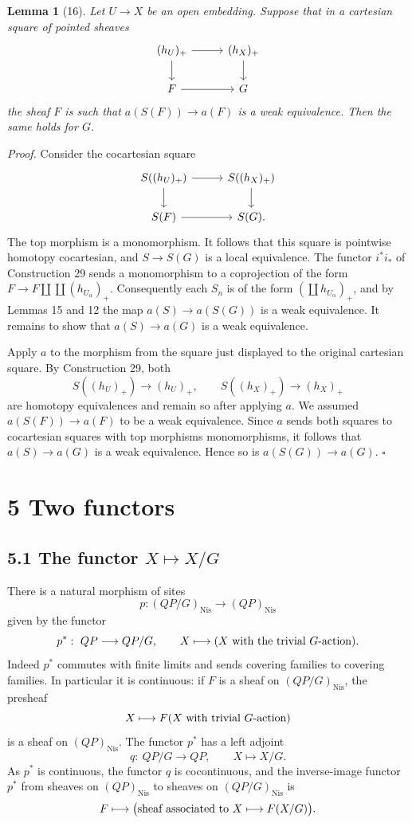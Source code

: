 \documentclass[11pt]{article}
\newcommand{\Nis}{\mathrm{Nis}}
\theoremstyle{deligne}
\newtheorem*{lemma*}{Lemma}
\newenvironment{proofdel}{\noindent\textit{Proof.}}{\hfill$\square$}
\begin{document}
\begin{lemma*}[16]
Let \(U\to X\) be an open embedding. Suppose that in a cartesian square of pointed sheaves
\[
\begin{tikzcd}[column sep=2.8em,row sep=1.8em]
(h_U)_+ \arrow[r] \arrow[d] & (h_X)_+ \arrow[d]\\
F \arrow[r] & G
\end{tikzcd}
\]
the sheaf \(F\) is such that \(a(S(F))\to a(F)\) is a weak equivalence. Then the same holds for \(G\).
\end{lemma*}

\begin{proofdel}
Consider the cocartesian square
\[
\begin{tikzcd}[column sep=2.8em,row sep=1.8em]
S((h_U)_+) \arrow[r] \arrow[d] & S((h_X)_+) \arrow[d]\\
S(F) \arrow[r] & S(G).
\end{tikzcd}
\]
The top morphism is a monomorphism. It follows that this square is pointwise homotopy cocartesian, and \(S\to S(G)\) is a local equivalence. The functor \(i^*i_*\) of Construction 29 sends a monomorphism to a coprojection of the form \(F\to F\amalg\coprod(h_{U_\alpha})_+\). Consequently each \(S_n\) is of the form \((\coprod h_{U_\alpha})_+\), and by Lemmas 15 and 12 the map \(a(S)\to a(S(G))\) is a weak equivalence. It remains to show that \(a(S)\to a(G)\) is a weak equivalence.

Apply \(a\) to the morphism from the square just displayed to the original cartesian square. By Construction 29, both
\[
S((h_U)_+)\to(h_U)_+,\qquad S((h_X)_+)\to(h_X)_+
\]
are homotopy equivalences and remain so after applying \(a\). We assumed \(a(S(F))\to a(F)\) to be a weak equivalence. Since \(a\) sends both squares to cocartesian squares with top morphisms monomorphisms, it follows that \(a(S)\to a(G)\) is a weak equivalence. Hence so is \(a(S(G))\to a(G)\).
\end{proofdel}

\section*{5 Two functors}

\subsection*{5.1 The functor \(X\mapsto X/G\)}

There is a natural morphism of sites
\[
p:(QP/G)_{\Nis}\longrightarrow (QP)_{\Nis}
\]
given by the functor
\[
p^*:\ QP\longrightarrow QP/G,\qquad X\longmapsto (X\hbox{ with the trivial }G\hbox{-action}).
\]
Indeed \(p^*\) commutes with finite limits and sends covering families to covering families. In particular it is continuous: if \(F\) is a sheaf on \((QP/G)_{\Nis}\), the presheaf
\[
X\longmapsto F(X\hbox{ with trivial }G\hbox{-action})
\]
is a sheaf on \((QP)_{\Nis}\). The functor \(p^*\) has a left adjoint
\[
q:\ QP/G\longrightarrow QP,\qquad X\longmapsto X/G .
\]
As \(p^*\) is continuous, the functor \(q\) is cocontinuous, and the inverse-image functor \(p^*\) from sheaves on \((QP)_{\Nis}\) to sheaves on \((QP/G)_{\Nis}\) is
\[
F\longmapsto \bigl(\hbox{sheaf associated to }X\longmapsto F(X/G)\bigr).
\]
\end{document}
